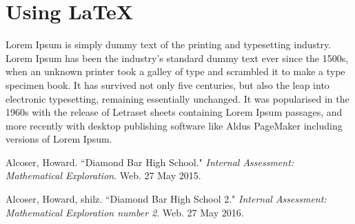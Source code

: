\documentclass[11pt]{article}
\begin{document}
\section{Using \LaTeX\ }




Lorem Ipsum is simply dummy text of the printing and typesetting industry. Lorem Ipsum has been the industry's standard dummy text ever since the 1500s, when an unknown printer took a galley of type and scrambled it to make a type specimen book. It has survived not only five centuries, but also the leap into electronic typesetting, remaining essentially unchanged. It was popularised in the 1960s with the release of Letraset sheets containing Lorem Ipsum passages, and more recently with desktop publishing software like Aldus PageMaker including versions of Lorem Ipsum.\cite{DBHS1} \\






\pagebreak
\begin{thebibliography}{}


Alcoser, Howard.
``Diamond Bar High School."
\textit{Internal Assessment: Mathematical Exploration}.
Web. 27 May 2015.

Alcoser, Howard, shilz.
``Diamond Bar High School 2."
\textit{Internal Assessment: Mathematical Exploration number 2}.
Web. 27 May 2016.



\end{thebibliography}
\end{document}
